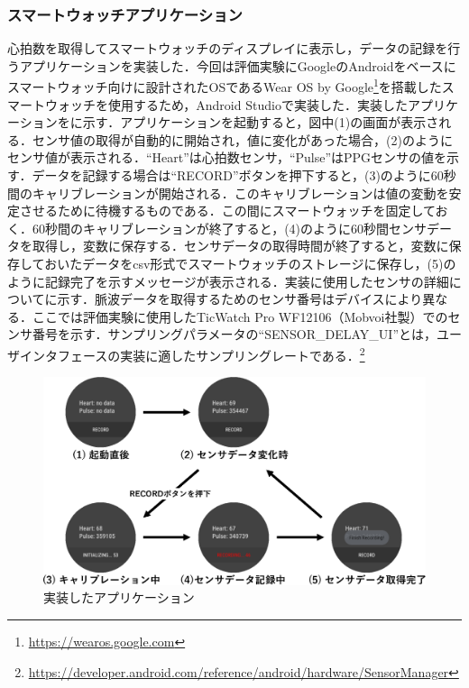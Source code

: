 \documentclass[Japanese,noauthor]{dicomopapers}
\begin{document}
\subsubsection{スマートウォッチアプリケーション}
心拍数を取得してスマートウォッチのディスプレイに表示し，データの記録を行うアプリケーションを実装した．今回は評価実験にGoogleのAndroidをベースにスマートウォッチ向けに設計されたOSであるWear OS by Google\footnote{\url{https://wearos.google.com}}を搭載したスマートウォッチを使用するため，Android Studioで実装した．実装したアプリケーションをに示す．アプリケーションを起動すると，図中(1)の画面が表示される．センサ値の取得が自動的に開始され，値に変化があった場合，(2)のようにセンサ値が表示される．``Heart''は心拍数センサ，``Pulse''はPPGセンサの値を示す．データを記録する場合は``RECORD''ボタンを押下すると，(3)のように60秒間のキャリブレーションが開始される．このキャリブレーションは値の変動を安定させるために待機するものである．この間にスマートウォッチを固定しておく．60秒間のキャリブレーションが終了すると，(4)のように60秒間センサデータを取得し，変数に保存する．センサデータの取得時間が終了すると，変数に保存しておいたデータをcsv形式でスマートウォッチのストレージに保存し，(5)のように記録完了を示すメッセージが表示される．実装に使用したセンサの詳細についてに示す．脈波データを取得するためのセンサ番号はデバイスにより異なる．ここでは評価実験に使用したTicWatch Pro WF12106（Mobvoi社製）でのセンサ番号を示す．サンプリングパラメータの``SENSOR\_DELAY\_UI''とは，ユーザインタフェースの実装に適したサンプリングレートである．\footnote{\url{https://developer.android.com/reference/android/hardware/SensorManager}}

\begin{figure}[!t]
  \begin{center}
    \includegraphics[width=1\linewidth]{figures/app.eps}
  \end{center}
  \caption{実装したアプリケーション}
  \label{fig:app}
\end{figure}
\end{document}
